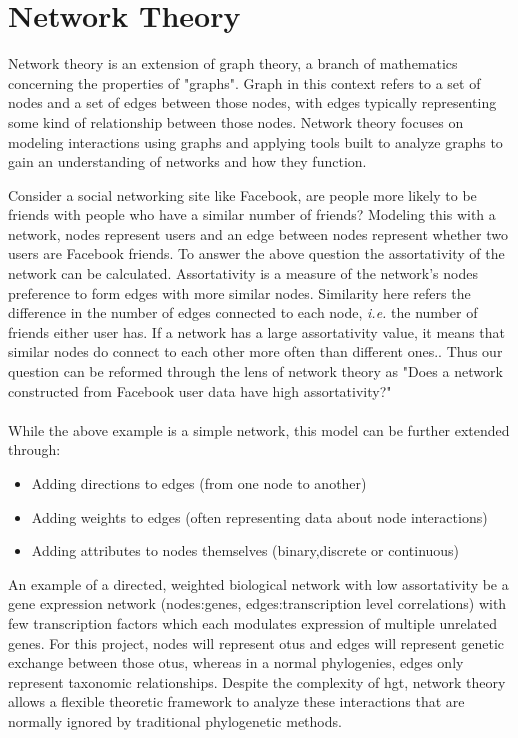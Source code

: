 \section{Network Theory}
Network theory is an extension of graph theory, a branch of mathematics concerning the properties of "graphs".
Graph in this context refers to a set of nodes and a set of edges between those nodes, with edges typically representing some kind of relationship between those nodes\citep{netgen}.
Network theory focuses on modeling interactions using graphs and applying tools built to analyze graphs to gain an understanding of networks and how they function.\par
Consider a social networking site like Facebook, are people more likely to be friends with people who have a similar number of friends?
Modeling this with a network, nodes represent users and an edge between nodes represent whether two users are Facebook friends.
To answer the above question the assortativity of the network can be calculated.
Assortativity is a measure of the network's nodes preference to form edges with more similar nodes\citep{netgen}.
Similarity here refers the difference in the number of edges connected to each node, \textit{i.e.} the number of friends either user has.
If a network has a large assortativity value, it means that similar nodes do connect to each other more often than different ones.\citep{netgen}.
Thus our question can be reformed through the lens of network theory as "Does a network constructed from Facebook user data have high assortativity?"\\\\
While the above example is a simple network, this model can be further extended through:
\begin{itemize}
    \item Adding directions to edges (from one node to another)
    \item Adding weights to edges (often representing data about node interactions)
    \item Adding attributes to nodes themselves (binary,discrete or continuous)
\end{itemize}
An example of a directed, weighted biological network with low assortativity be a gene expression network (nodes:genes, edges:transcription level correlations) with few transcription factors which each modulates expression of multiple unrelated genes.
For this project, nodes will represent \ac{otu}s and edges will represent genetic exchange between those \ac{otu}s, whereas in a normal phylogenies, edges only represent taxonomic relationships.
Despite the complexity of \ac{hgt}, network theory allows a flexible theoretic framework to analyze these interactions that are normally ignored by traditional phylogenetic methods.

